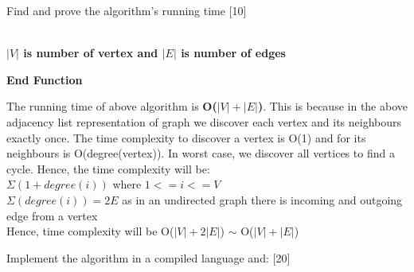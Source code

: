 \documentclass[12pt,letterpaper, onecolumn]{exam}
\begin{document}
\begin{questions}
    \question Find and prove the algorithm's running time [10]\droppoints
    
    \begin{solution}
    \\
            \textbf{$|V|$ is number of vertex and $|E|$ is number of edges}
            \begin{algorithm}[H]
            \textbf{End Function}
            \label{FindCycleAlgo} 
            \end{algorithm}
            The running time of above algorithm is \textbf{O($|V|+|E|$)}. This is because in the above adjacency list representation of graph we discover each vertex and its neighbours exactly once. The time complexity to discover a vertex is O(1) and for its neighbours is O(degree(vertex)). In worst case, we discover all vertices to find a cycle. Hence, the time complexity will be:\\
            $\Sigma(1+degree(i))$ where $1<=i<=V$\\
            $\Sigma(degree(i)) = 2E$ as in an undirected graph there is incoming and outgoing edge from a vertex\\
            Hence, time complexity will be O($|V|+2|E|$) $\sim$ O($|V|+|E|$)
    \end{solution}
    \pagebreak %
    \question Implement the algorithm in a compiled language and: [20]\droppoints
        \begin{solution}
            \begin{parts}

\end{parts}
\end{solution}
\end{questions}
\end{document}
